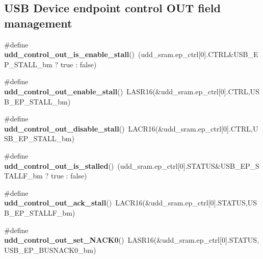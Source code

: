 \subsection*{U\-S\-B Device endpoint control O\-U\-T field management}
\begin{DoxyCompactItemize}
\item 
\hypertarget{group__udd__xmega__usb__group_gae1263d0878d16a4c15b7b43386efa02b}{\#define {\bfseries udd\-\_\-control\-\_\-out\-\_\-is\-\_\-enable\-\_\-stall}()~(udd\-\_\-sram.\-ep\-\_\-ctrl\mbox{[}0\mbox{]}.C\-T\-R\-L\&U\-S\-B\-\_\-\-E\-P\-\_\-\-S\-T\-A\-L\-L\-\_\-bm ? true \-: false)}\label{group__udd__xmega__usb__group_gae1263d0878d16a4c15b7b43386efa02b}

\item 
\hypertarget{group__udd__xmega__usb__group_gabf0bdcf99cd5847d1f9cd5ea4d5ef41a}{\#define {\bfseries udd\-\_\-control\-\_\-out\-\_\-enable\-\_\-stall}()~L\-A\-S\-R16(\&udd\-\_\-sram.\-ep\-\_\-ctrl\mbox{[}0\mbox{]}.C\-T\-R\-L,U\-S\-B\-\_\-\-E\-P\-\_\-\-S\-T\-A\-L\-L\-\_\-bm)}\label{group__udd__xmega__usb__group_gabf0bdcf99cd5847d1f9cd5ea4d5ef41a}

\item 
\hypertarget{group__udd__xmega__usb__group_ga251f22f1df2e9ed64bee829c9b22831a}{\#define {\bfseries udd\-\_\-control\-\_\-out\-\_\-disable\-\_\-stall}()~L\-A\-C\-R16(\&udd\-\_\-sram.\-ep\-\_\-ctrl\mbox{[}0\mbox{]}.C\-T\-R\-L,U\-S\-B\-\_\-\-E\-P\-\_\-\-S\-T\-A\-L\-L\-\_\-bm)}\label{group__udd__xmega__usb__group_ga251f22f1df2e9ed64bee829c9b22831a}

\item 
\hypertarget{group__udd__xmega__usb__group_ga85e18b60c1ec91175a3f3b2d85733874}{\#define {\bfseries udd\-\_\-control\-\_\-out\-\_\-is\-\_\-stalled}()~(udd\-\_\-sram.\-ep\-\_\-ctrl\mbox{[}0\mbox{]}.S\-T\-A\-T\-U\-S\&U\-S\-B\-\_\-\-E\-P\-\_\-\-S\-T\-A\-L\-L\-F\-\_\-bm ? true \-: false)}\label{group__udd__xmega__usb__group_ga85e18b60c1ec91175a3f3b2d85733874}

\item 
\hypertarget{group__udd__xmega__usb__group_gac4c27963d2479cb46af9fdbda90eea92}{\#define {\bfseries udd\-\_\-control\-\_\-out\-\_\-ack\-\_\-stall}()~L\-A\-C\-R16(\&udd\-\_\-sram.\-ep\-\_\-ctrl\mbox{[}0\mbox{]}.S\-T\-A\-T\-U\-S,U\-S\-B\-\_\-\-E\-P\-\_\-\-S\-T\-A\-L\-L\-F\-\_\-bm)}\label{group__udd__xmega__usb__group_gac4c27963d2479cb46af9fdbda90eea92}

\item 
\hypertarget{group__udd__xmega__usb__group_gaca248ccaaf8ad6592ebc4a144b472e27}{\#define {\bfseries udd\-\_\-control\-\_\-out\-\_\-set\-\_\-\-N\-A\-C\-K0}()~L\-A\-S\-R16(\&udd\-\_\-sram.\-ep\-\_\-ctrl\mbox{[}0\mbox{]}.S\-T\-A\-T\-U\-S,U\-S\-B\-\_\-\-E\-P\-\_\-\-B\-U\-S\-N\-A\-C\-K0\-\_\-bm)}\label{group__udd__xmega__usb__group_gaca248ccaaf8ad6592ebc4a144b472e27}


\end{DoxyCompactItemize}
